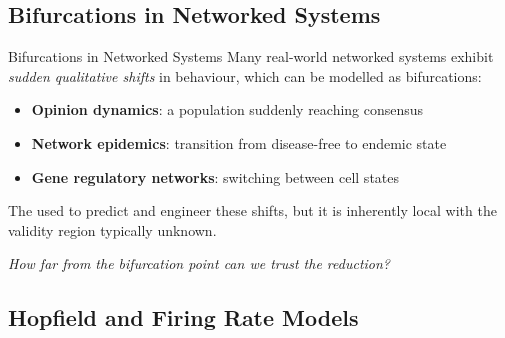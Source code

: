 \documentclass[11pt]{beamer}
\begin{document}
\subsection{Bifurcations in Networked Systems}

\begin{frame}{Bifurcations in Networked Systems}
    Many real-world networked systems exhibit \emph{sudden qualitative shifts} in behaviour, which can be modelled as bifurcations:
    \begin{itemize}
        \item \textbf{Opinion dynamics}: a population suddenly reaching consensus
        \item \textbf{Network epidemics}: transition from disease-free to endemic state
        \item \textbf{Gene regulatory networks}: switching between cell states
    \end{itemize}

    \vspace{5mm} \pause

    The \alert{\LSR{}} used to predict and engineer these shifts, but it is inherently local with the validity region typically unknown.

    \vspace{3mm}

    \begin{center}
        \emph{How far from the bifurcation point can we trust the reduction?}
    \end{center}
\end{frame}

\subsection{Hopfield and Firing Rate Models}
\end{document}
